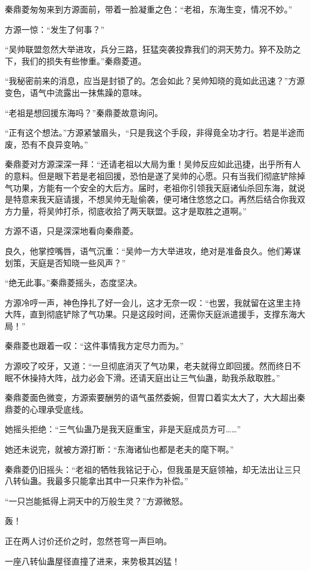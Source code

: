 \begin{this_body}
秦鼎菱匆匆来到方源面前，带着一脸凝重之色：“老祖，东海生变，情况不妙。”

方源一惊：“发生了何事？”

“吴帅联盟忽然大举进攻，兵分三路，狂猛突袭投靠我们的洞天势力。猝不及防之下，我们的损失有些惨重。”秦鼎菱道。

“我秘密前来的消息，应当是封锁了的。怎会如此？吴帅知晓的竟如此迅速？”方源变色，语气中流露出一抹焦躁的意味。

“老祖是想回援东海吗？”秦鼎菱故意询问。

“正有这个想法。”方源紧皱眉头，“只是我这个手段，非得竟全功才行。若是半途而废，恐有不良异变呐。”

秦鼎菱对方源深深一拜：“还请老祖以大局为重！吴帅反应如此迅捷，出乎所有人的意料。但是眼下若是老祖回援，恐怕是遂了吴帅的心愿。只有当我们彻底铲除掉气功果，方能有一个安全的大后方。届时，老祖你引领我天庭诸仙杀回东海，就说是特意来我天庭请援，不想吴帅无耻偷袭，便可堵住悠悠之口。再然后结合你我双方力量，将吴帅打杀，彻底收拾了两天联盟。这才是取胜之道啊。”

方源不语，只是深深地看向秦鼎菱。

良久，他掌控嘴唇，语气沉重：“吴帅一方大举进攻，绝对是准备良久。他们筹谋划策，天庭是否知晓一些风声？”

“绝无此事。”秦鼎菱摇头，态度坚决。

方源冷哼一声，神色挣扎了好一会儿，这才无奈一叹：“也罢，我就留在这里主持大阵，直到彻底铲除了气功果。只是这段时间，还需你天庭派遣援手，支撑东海大局！”

秦鼎菱也跟着一叹：“这件事情我方定尽力而为。”

方源咬了咬牙，又道：“一旦彻底消灭了气功果，老夫就得立即回援。然而终日不眠不休操持大阵，战力必会下滑。还请天庭出让三气仙蛊，助我杀敌取胜。”

秦鼎菱面色微变，方源索要酬劳的语气虽然委婉，但胃口着实太大了，大大超出秦鼎菱的心理承受底线。

她摇头拒绝：“三气仙蛊乃是我天庭重宝，非是天庭成员方可……”

她还未说完，就被方源打断：“东海诸仙也都是老夫的麾下啊。”

秦鼎菱仍旧摇头：“老祖的牺牲我铭记于心，但我虽是天庭领袖，却无法出让三只八转仙蛊。我最多只能拿出其中一只来作为补偿。”

“一只岂能抵得上洞天中的万般生灵？”方源微怒。

轰！

正在两人讨价还价之时，忽然苍穹一声巨响。

一座八转仙蛊屋径直撞了进来，来势极其凶猛！


\end{this_body}
